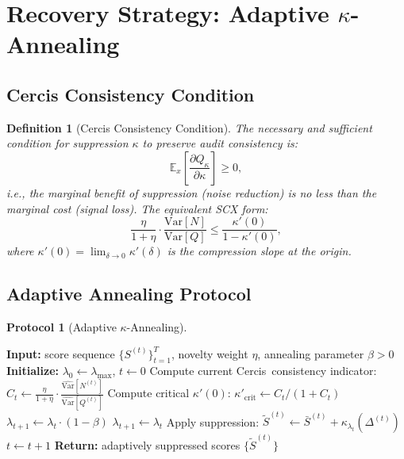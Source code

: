 \documentclass[12pt,a4paper]{article}
\newtheorem{definition}[theorem]{Definition}
\theoremstyle{definition}
\newtheorem{protocol}[theorem]{Protocol}
\newcommand{\E}{\mathbb{E}}
\newcommand{\Var}{\mathrm{Var}}
\newcommand{\Cercis}{\textsf{Cercis}}
\begin{document}
\section{Recovery Strategy: Adaptive $\kappa$-Annealing}
\label{sec:recovery}

\subsection{Cercis Consistency Condition}

\begin{definition}[Cercis Consistency Condition]
\label{def:cercis_consistency}
The necessary and sufficient condition for suppression $\kappa$ to preserve audit consistency is:
\begin{equation}
    \E_x\left[\frac{\partial Q_\kappa}{\partial \kappa}\right] \geq 0,
\end{equation}
i.e., the marginal benefit of suppression (noise reduction) is no less than the marginal cost (signal loss). The equivalent SCX form:
\begin{equation}
    \frac{\eta}{1+\eta} \cdot \frac{\Var[N]}{\Var[Q]} \leq \frac{\kappa'(0)}{1 - \kappa'(0)},
\end{equation}
where $\kappa'(0) = \lim_{\delta \to 0} \kappa'(\delta)$ is the compression slope at the origin.
\end{definition}

\subsection{Adaptive Annealing Protocol}

\begin{protocol}[Adaptive $\kappa$-Annealing]
\label{prot:annealing}
\begin{algorithmic}[1]
\State \textbf{Input:} score sequence $\{S^{(t)}\}_{t=1}^T$, novelty weight $\eta$, annealing parameter $\beta > 0$
\State \textbf{Initialize:} $\lambda_0 \leftarrow \lambda_{\max}$, $t \leftarrow 0$
    \State Compute current \Cercis~consistency indicator:
    \State \quad $C_t \leftarrow \frac{\eta}{1+\eta} \cdot \frac{\widehat{\Var}[N^{(t)}]}{\widehat{\Var}[Q^{(t)}]}$
    \State Compute critical $\kappa'(0)$: $\kappa'_{\text{crit}} \leftarrow C_t / (1 + C_t)$
    \State {}
        \State $\lambda_{t+1} \leftarrow \lambda_t \cdot (1 - \beta)$ 
    \Else
        \State $\lambda_{t+1} \leftarrow \lambda_t$ 
    \EndIf
    \State Apply suppression: $\tilde{S}^{(t)} \leftarrow \bar{S}^{(t)} + \kappa_{\lambda_t}(\Delta^{(t)})$
    \State $t \leftarrow t + 1$
\EndWhile
\State \textbf{Return:} adaptively suppressed scores $\{\tilde{S}^{(t)}\}$
\end{algorithmic}
\end{protocol}
\end{document}
